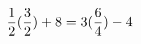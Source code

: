 \documentclass[preview]{standalone}
\begin{document}
\begin{align*}
\special{dvisvgm:raw <g id='unique000'>}\frac{1}{2} (\frac{3}{2}) + 8 = 3(\frac{6}{4}) - 4\special{dvisvgm:raw </g>}
\end{align*}
\end{document}
